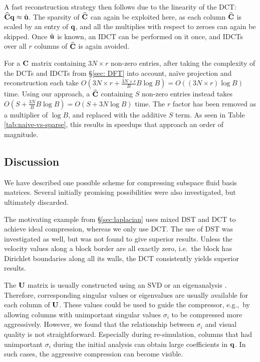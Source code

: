 A fast reconstruction strategy then follows due to the linearity of the DCT: $\widehat{\mathbf{C}}\mathbf{q} \approx \hat{\mathbf{u}}$. The sparsity of $\widehat{\mathbf{C}}$ can again be exploited here, as each column $\widehat{\mathbf{C}}$ is scaled by an entry of $\mathbf{q}$, and all the multiplies with respect to zeroes can again be skipped. Once $\hat{\mathbf{u}}$ is known, an IDCT can be performed on it once, and IDCTs over all $r$ columns of $\widehat{\mathbf{C}}$ is again avoided.

For a $\mathbf{C}$ matrix containing ${3N \times r}$ non-zero entries, after taking the complexity of the DCTs and IDCTs from \S\ref{sec: DFT} into account, na\"{i}ve projection and reconstruction each take $O\left(3N \times r +\frac{3N \times r}{B} B \log B\right) = O\left((3N \times r)\log B\right)$ time. Using our approach, a $\widehat{\mathbf{C}}$ containing $S$ non-zero entries instead takes $O\left(S + \frac{3N}{B} B \log B\right) = O\left(S + 3N \log B\right)$ time. The $r$ factor has been removed as a multiplier of $\log B$, and replaced with the additive $S$ term. As seen in Table \ref{tab:naive-vs-sparse}, this results in speedups that approach an order of magnitude.

\subsection{Discussion}

We have described one possible scheme for compressing subspace fluid basis matrices. Several initially promising possibilities were also investigated, but ultimately discarded.

The motivating example from \S\ref{sec:laplacian} uses mixed DST and DCT to achieve ideal compression, whereas we only use DCT. The use of DST was investigated as well, but was not found to give superior results. Unless the velocity values along a block border are all exactly zero, i.e.~the block has Dirichlet boundaries along all its walls, the DCT consistently yields superior results.

The $\mathbf{U}$ matrix is usually constructed using an SVD \cite{Treuille:2006:MRF,Kim2013} or an eigenanalysis \cite{deWitt:2012,Liu:2015:MVF}. Therefore, corresponding singular values or eigenvalues are usually available for each column of $\mathbf{U}$. These values could be used to guide the compressor, e.g.,~by allowing columns with unimportant singular values $\sigma_i$ to be compressed more aggressively. However, we found that the relationship between $\sigma_i$ and visual quality is not straightforward. Especially during re-simulation, columns that had unimportant $\sigma_i$ during the initial analysis can obtain large coefficients in $\mathbf{q}$. In such cases, the aggressive compression can become visible.

